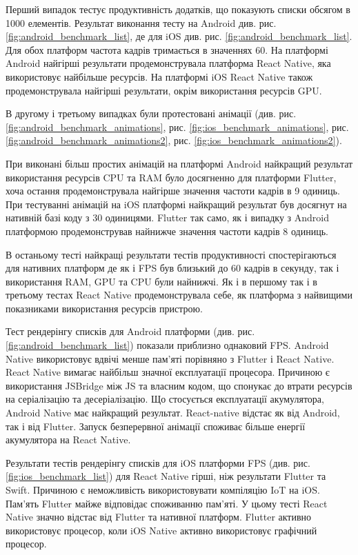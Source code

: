 Перший випадок тестує продуктивність додатків, що показують списки обсягом в 1000 елементів.
Результат виконання тесту на Android див. рис. \ref{fig:android_benchmark_list}, де
для iOS див. рис. \ref{fig:android_benchmark_list}.
Для обох платформ частота кадрів тримається в значеннях 60.
На платформі Android найгірші результати продемонструвала платформа React Native, яка використовує найбільше ресурсів.
На платформі iOS React Native також продемонструвала найгірші результати, окрім використання ресурсів GPU.

В другому і третьому випадках були протестовані анімації (див. рис.
\ref{fig:android_benchmark_animations}, рис. \ref{fig:ios_benchmark_animations},
рис. \ref{fig:android_benchmark_animations2}, рис. \ref{fig:ios_benchmark_animations2}).

При виконані більш простих анімацій на платформі Android найкращий результат використання ресурсів CPU та RAM було
досягненно для платформи Flutter, хоча остання продемонструвала найгірше значення частоти кадрів в 9 одиниць.
При тестуванні анімацій на iOS платформі найкращий результат був досягнут на нативній базі коду з 30 одиницями.
Flutter так само, як і випадку з Android платформою продемонстрував найнижче значення частоти кадрів 8 одиниць.

В останьому тесті найкращі результати тестів продуктивності спостерігаються для нативних платформ де як і FPS був близький до 60 кадрів в секунду,
так і використання RAM, GPU та CPU були найнижчі. Як і в першому так і в третьому тестах React Native продемонструвала
себе, як платформа з найвищими показниками використання ресурсів пристрою.

Тест рендерінгу списків для Android платформи (див. рис. \ref{fig:android_benchmark_list}) показали приблизно однаковий FPS.
Android Native використовує вдвічі менше пам'яті порівняно з Flutter і React Native.
React Native вимагає найбільш значної експлуатації процесора.
Причиною є використання JSBridge між JS та власним кодом, що спонукає до втрати ресурсів на серіалізацію та десеріалізацію.
Що стосується експлуатації акумулятора, Android Native має найкращий результат.
React-native відстає як від Android, так і від Flutter.
Запуск безперервної анімації споживає більше енергії акумулятора на React Native.

Результати тестів рендерінгу списків для iOS платформи FPS (див. рис. \ref{fig:ios_benchmark_list}) для React Native гірші, ніж результати Flutter та Swift.
Причиною є неможливість використовувати компіляцію IoT на iOS.
Пам'ять Flutter майже відповідає споживанню пам'яті.
У цьому тесті React Native значно відстає від Flutter та нативної платформ.
Flutter активно використовує процесор, коли iOS Native активно використовує графічний процесор.

